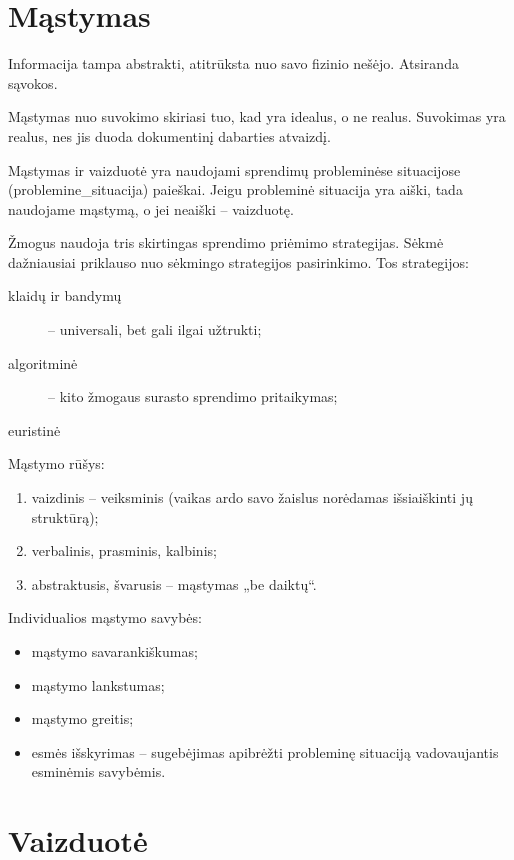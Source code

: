 \section{Mąstymas}

Informacija tampa abstrakti, atitrūksta nuo savo fizinio nešėjo. Atsiranda
sąvokos.

Mąstymas nuo suvokimo skiriasi tuo, kad yra idealus, o ne realus. Suvokimas
yra realus, nes jis duoda dokumentinį dabarties atvaizdį.

Mąstymas ir vaizduotė yra naudojami sprendimų probleminėse situacijose
(\gls{problemine_situacija}) paieškai. Jeigu probleminė situacija yra aiški,
tada naudojame mąstymą, o jei neaiški – vaizduotę.

Žmogus naudoja tris skirtingas sprendimo priėmimo strategijas. Sėkmė 
dažniausiai priklauso nuo sėkmingo strategijos pasirinkimo. Tos strategijos:

\begin{description}
  \item[klaidų ir bandymų] – universali, bet gali ilgai užtrukti;
  \item[algoritminė] – kito žmogaus surasto sprendimo pritaikymas;
  \item[euristinė] %
\end{description}

Mąstymo rūšys:

\begin{enumerate}
  \item vaizdinis – veiksminis (vaikas ardo savo žaislus norėdamas 
    išsiaiškinti jų struktūrą);
  \item verbalinis, prasminis, kalbinis;
  \item abstraktusis, švarusis – mąstymas „be daiktų“.
\end{enumerate}

Individualios mąstymo savybės:

\begin{itemize}
  \item mąstymo savarankiškumas;
  \item mąstymo lankstumas;
  \item mąstymo greitis;
  \item esmės išskyrimas – sugebėjimas apibrėžti probleminę situaciją 
    vadovaujantis esminėmis savybėmis.
\end{itemize}

\section{Vaizduotė}

